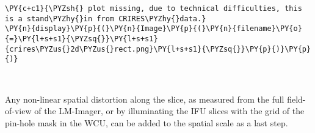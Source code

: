 \begin{tcolorbox}[breakable, size=fbox, boxrule=1pt, pad at break*=1mm,colback=cellbackground, colframe=cellborder]
\begin{Verbatim}[commandchars=\\\{\}]
\PY{c+c1}{\PYZsh{} plot missing, due to technical difficulties, this is a stand\PYZhy{}in from CRIRES\PYZhy{}data.}
\PY{n}{display}\PY{p}{(}\PY{n}{Image}\PY{p}{(}\PY{n}{filename}\PY{o}{=}\PY{l+s+s1}{\PYZsq{}}\PY{l+s+s1}{crires\PYZus{}2d\PYZus{}rect.png}\PY{l+s+s1}{\PYZsq{}}\PY{p}{)}\PY{p}{)}
\end{Verbatim}
\end{tcolorbox}

\begin{center}
\end{center}
{ \hspace*{\fill} \\}

Any non-linear spatial distortion along the slice, as measured from the
full field-of-view of the LM-Imager, or by illuminating the IFU slices
with the grid of the pin-hole mask in the WCU, can be added to the
spatial scale as a last step.

